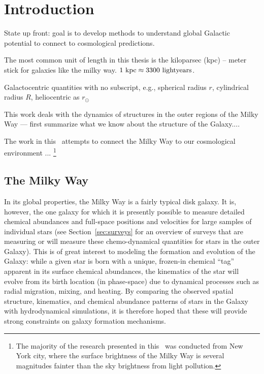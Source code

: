 \chapter[Introduction]{Introduction}
\label{ch:intro}


State up front: goal is to develop methods to understand global Galactic potential to connect to cosmological predictions.

The most common unit of length in this thesis is the kiloparsec (kpc) -- meter stick for galaxies like the milky way. $1~\mathrm{kpc} \approx 3300~{\rm light years}$.

Galactocentric quantities with no subscript, e.g., spherical radius $r$, cylindrical radius $R$, heliocentric as $r_\odot$

This work deals with the dynamics of structures in the outer regions of the Milky Way --- first summarize what we know about the structure of the Galaxy....

The work in this \article\ attempts to connect the Milky Way to our cosmological environment ... \footnote{The majority of the research presented in this \article\ was conducted from New York city, where the surface brightness of the Milky Way is several magnitudes fainter than the sky brightness from light pollution.}

\section{The Milky Way}\label{sec:milkyway}

In its global properties, the Milky Way is a fairly typical disk galaxy. It is, however, the one galaxy for which it is presently possible to measure detailed chemical abundances and full-space positions and velocities for large samples of individual stars (see Section~\ref{sec:surveys} for an overview of surveys that are measuring or will measure these chemo-dynamical quantities for stars in the outer Galaxy). This is of great interest to modeling the formation and evolution of the Galaxy: while a given star is born with a unique, frozen-in chemical ``tag'' apparent in its surface chemical abundances, the kinematics of the star will evolve from its birth location (in phase-space) due to dynamical processes such as radial migration, mixing, and heating. By comparing the observed spatial structure, kinematics, and chemical abundance patterns of stars in the Galaxy with hydrodynamical simulations, it is therefore hoped that these will provide strong constraints on galaxy formation mechanisms. 

